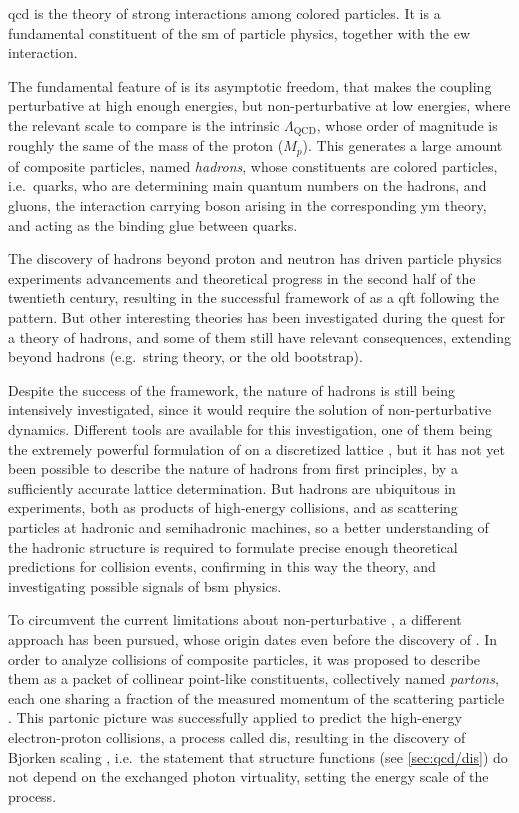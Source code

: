 \acrfull{qcd} is the theory of strong interactions among colored particles.
It is a fundamental constituent of the \acrfull{sm} of particle physics,
together with the \acrfull{ew} interaction.

The fundamental feature of \qcd is its asymptotic freedom, that makes the
coupling perturbative at high enough energies, but non-perturbative at low
energies, where the relevant scale to compare is the intrinsic
$\Lambda_{\text{QCD}}$, whose order of magnitude is roughly the same of the
mass of the proton ($M_p$).
%
This generates a large amount of composite particles, named \textit{hadrons},
whose constituents are colored particles, i.e.\ quarks, who are determining
main quantum numbers on the hadrons, and gluons, the interaction carrying boson
arising in the corresponding \acrfull{ym} theory, and acting as the binding
glue between quarks.

The discovery of hadrons beyond proton and neutron has driven particle physics
experiments advancements and theoretical progress in the second half of the
twentieth century, resulting in the successful framework of \qcd as a
\acrlong{qft} following the \ym pattern.
But other interesting theories has been investigated during the quest for a
theory of hadrons, and some of them still have relevant consequences, extending
beyond hadrons (e.g.\ string theory, or the old bootstrap).

Despite the success of the framework, the nature of hadrons is still being
intensively investigated, since it would require the solution of
non-perturbative \qcd dynamics.
%
Different tools are available for this investigation, one of them being the
extremely powerful formulation of \qcd on a discretized lattice
\cite{Wilson:1974sk}, but it has not yet been possible to describe the nature
of hadrons from first principles, by a sufficiently accurate lattice
determination.
%
But hadrons are ubiquitous in \hep experiments, both as products of high-energy
collisions, and as scattering particles at hadronic and semihadronic machines,
so a better understanding of the hadronic structure is required to formulate
precise enough theoretical predictions for collision events, confirming in this
way the \sm theory, and investigating possible signals of \acrfull{bsm}
physics.

To circumvent the current limitations about non-perturbative \qft, a different
approach has been pursued, whose origin dates even before the discovery of
\qcd.
In order to analyze collisions of composite particles, it was proposed to
describe them as a packet of collinear point-like constituents, collectively
named \textit{partons}, each one sharing a fraction of the measured momentum of
the scattering particle \cite{Feynman:1969wa}.
%
This partonic picture was successfully applied to predict the high-energy
electron-proton collisions, a process called \acrfull{dis}, resulting in the
discovery of Bjorken scaling \cite{Bjorken:1967fb}, i.e.\ the statement that
\dis structure functions (see \cref{sec:qcd/dis}) do not depend on the
exchanged photon virtuality, setting the energy scale of the process.

